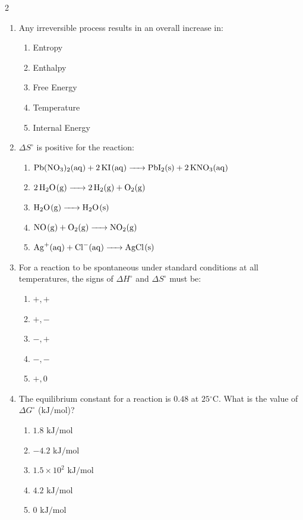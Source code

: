 \documentclass[12pt,letterpaper]{article}
\begin{document}
\begin{multicols*}{2}
\begin{enumerate}
        \item Any irreversible process results in an overall increase in: %
            \begin{enumerate}
                \item Entropy
                \item Enthalpy
                \item Free Energy
                \item Temperature
                \item Internal Energy
            \end{enumerate}
        \columnbreak
        \item $\Delta S^\circ$ is positive for the reaction: %
            \begin{enumerate}
                \item $\ce{Pb(NO3)2(aq) + 2KI(aq) -> PbI2(s) + 2KNO3(aq)}$
                \item $\ce{2H2O(g) -> 2H2(g) + O2(g)}$
                \item $\ce{H2O(g) -> H2O(s)}$
                \item $\ce{NO(g) + O2(g) -> NO2(g)}$
                \item $\ce{Ag+(aq) + Cl-(aq) -> AgCl(s)}$
            \end{enumerate}

        \item For a reaction to be spontaneous under standard conditions at all temperatures, the signs of $\Delta H^\circ$ and $\Delta S^\circ$ must be: %
            \begin{enumerate}
                \item $+, +$
                \item $+, -$
                \item $-, +$
                \item $-, -$
                \item $+, 0$
            \end{enumerate}

        \item The equilibrium constant for a reaction is $0.48$ at $25\text{}^\circ\text{C}$. What is the value of $\Delta G^\circ$ ($\text{kJ/mol}$)? %
            \begin{enumerate}
                \item $1.8\text{ kJ/mol}$
                \item $-4.2\text{ kJ/mol}$
                \item $1.5 \times 10^2\text{ kJ/mol}$
                \item $4.2\text{ kJ/mol}$
                \item $0\text{ kJ/mol}$
            \end{enumerate}


\end{enumerate}
\end{multicols*}
\end{document}
